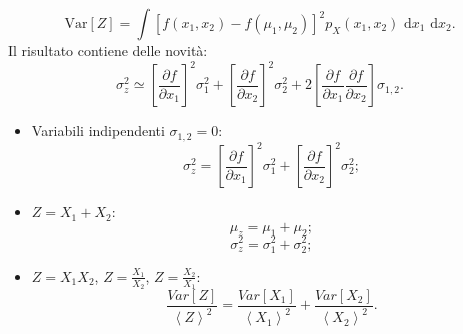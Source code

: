 \begin{itemize}
\begin{itemize}
\begin{equation}
\textrm{Var}\left[ Z \right] =\int { { \left[ f\left( { x }_{ 1 },{ x }_{ 2 } \right) -f\left( { \mu  }_{ 1 },\mu _{ 2 } \right)  \right]  }^{ 2 }{ p }_{ X }\left( { x }_{ 1 },{ x }_{ 2 } \right) \textrm{ d}{ x }_{ 1 }\textrm{ d}{ x }_{ 2 } } .
\end{equation}
Il risultato contiene delle novità:
\begin{equation}
\label{eq:varianza-z-composta}
{ \sigma  }^{ 2 }_{ z }\simeq { \left[ \frac { \partial f }{ \partial { x }_{ 1 } }  \right]  }^{ 2 }{ \sigma  }_{ 1 }^{ 2 }+{ \left[ \frac { \partial f }{ \partial { x }_{ 2 } }  \right]  }^{ 2 }{ \sigma  }_{ 2 }^{ 2 }+2{ \left[ \frac { \partial f }{ \partial { x }_{ 1 } } \frac { \partial f }{ \partial { x }_{ 2 } }  \right]  }{ \sigma  }_{ 1,2 }.
\end{equation}
\begin{itemize}
\item Variabili indipendenti $\sigma_{1,2}=0$:
\begin{equation}
{ \sigma  }^{ 2 }_{ z }={ \left[ \frac { \partial f }{ \partial { x }_{ 1 } }  \right]  }^{ 2 }{ \sigma  }_{ 1 }^{ 2 }+{ \left[ \frac { \partial f }{ \partial { x }_{ 2 } }  \right]  }^{ 2 }{ \sigma  }_{ 2 }^{ 2 };
\end{equation}
\item $Z=X_1+X_2$:
\begin{equation}
\mu_z=\mu_1+\mu_2;
\end{equation}
\begin{equation}
\sigma^2_z=\sigma^2_1+\sigma^2_2;
\end{equation}
\item $Z=X_1X_2$, $Z=\frac{X_1}{X_2}$, $Z=\frac{X_2}{X_1}$:
\begin{equation}
\frac { Var\left[ Z \right]  }{ { \left< Z \right>  }^{ 2 } } =\frac { Var\left[ { X }_{ 1 } \right]  }{ { \left< { X }_{ 1 } \right>  }^{ 2 } } +\frac { Var\left[ { X }_{ 2 } \right]  }{ { \left< { X }_{ 2 } \right>  }^{ 2 } } .
\end{equation}
\end{itemize}
\end{itemize}
\end{itemize}